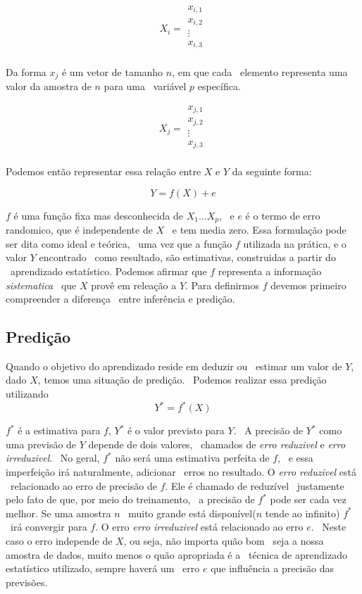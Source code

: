 \[
X_{i} = \begin{matrix}
x_{i,1} \\
x_{i,2} \\
\vdots  \\
x_{i,3} \\
\end{matrix}
\]

Da  forma $x_j$ é um vetor de tamanho $n$, em que cada \
elemento representa uma valor da amostra de $n$ para uma \
variável $p$ específica.

\[
X_{j} = \begin{matrix}
x_{j,1} \\
x_{j,2} \\
\vdots  \\
x_{j,3} \\
\end{matrix}
\]

Podemos então representar essa relação entre $X$ e $Y$ da seguinte forma:

\[
  Y = f(X) + e
\]

$f$ é uma função fixa mas desconhecida de $X_1...X_p$, \
e $e$ é o termo de erro randomico, que é independente de $X$ \
e tem media zero. Essa formulação pode ser dita como ideal e teórica, \
uma vez que a função $f$ utilizada na prática, e o valor $Y$ encontrado \
como resultado, são estimativas, construidas a partir do \
aprendizado estatístico.
Podemos afirmar que $f$ representa a informação \textit{sistematica} \
que $X$ provê em releação a $Y$\cite{Jordan}.
Para definirmos $f$ devemos primeiro compreender a diferença \
entre inferência e predição.

\subsection{Predição}
Quando o objetivo do aprendizado reside em deduzir ou \
estimar um valor de $Y$, dado $X$, temos uma situação de predição. \
Podemos realizar essa predição utilizando
\[
  Y^* = f^*(X)
\]

$f^*$ é a estimativa para $f$, $Y^*$ é o valor previsto para $Y$. \
A precisão de $Y^*$ como uma previsão de $Y$ depende de dois valores, \
chamados de \textit{erro reduzivel} e \textit{erro irreduzivel}. \
No geral, $f^*$ não será uma estimativa perfeita de $f$, \
e essa imperfeição irá naturalmente, adicionar \
erros no resultado\cite{Jordan}.  O \textit{erro reduzivel} está \
relacionado ao erro de precisão de $f$. Ele é chamado de reduzível \
justamente pelo fato de que, por meio do treinamento, \
a precisão de $f^*$ pode ser cada vez melhor. Se uma amostra $n$ \
muito grande está disponível($n$ tende ao infinito) $f^*$ \
irá convergir para $f$\cite{Malhotra}.
O erro \textit{erro irreduzivel} está relacionado ao erro $e$. \
Neste caso o erro independe de $X$, ou seja, não importa quão bom \
seja a nossa amostra de dados, muito menos o quão apropriada é a \
técnica de aprendizado estatístico utilizado, sempre haverá um \
erro $e$ que influência a precisão das previsões\cite{Jordan}.


